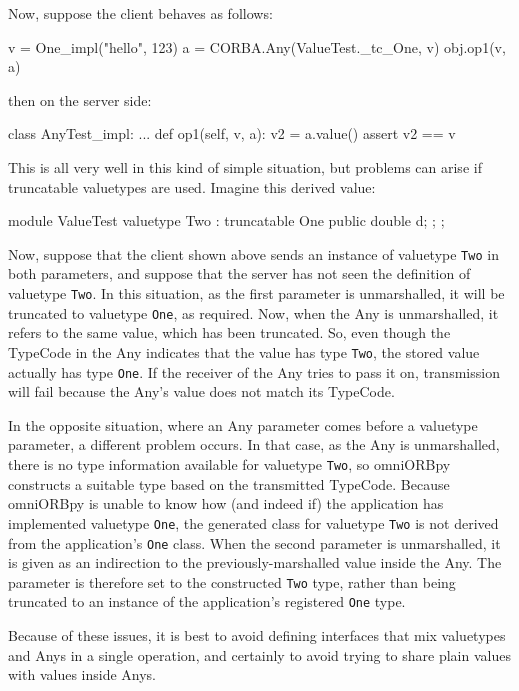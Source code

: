 \documentclass[11pt,twoside,a4paper]{book}
\newcommand{\type}[1]{\texttt{#1}}
\begin{document}
\noindent Now, suppose the client behaves as follows:

\begin{pylisting}
v = One_impl("hello", 123)
a = CORBA.Any(ValueTest._tc_One, v)
obj.op1(v, a)
\end{pylisting}

\noindent then on the server side:

\begin{pylisting}
class AnyTest_impl:
    ...
    def op1(self, v, a):
        v2 = a.value()
        assert v2 == v
\end{pylisting}

\noindent
This is all very well in this kind of simple situation, but problems
can arise if truncatable valuetypes are used. Imagine this derived
value:

\begin{idllisting}
module ValueTest {
  valuetype Two : truncatable One {
    public double d;
  };
};
\end{idllisting}

\noindent
Now, suppose that the client shown above sends an instance of
valuetype \type{Two} in both parameters, and suppose that the server
has not seen the definition of valuetype \type{Two}. In this
situation, as the first parameter is unmarshalled, it will be
truncated to valuetype \type{One}, as required. Now, when the Any is
unmarshalled, it refers to the same value, which has been truncated.
So, even though the TypeCode in the Any indicates that the value has
type \type{Two}, the stored value actually has type \type{One}. If the
receiver of the Any tries to pass it on, transmission will fail
because the Any's value does not match its TypeCode.

In the opposite situation, where an Any parameter comes before a
valuetype parameter, a different problem occurs. In that case, as the
Any is unmarshalled, there is no type information available for
valuetype \type{Two}, so omniORBpy constructs a suitable type based on
the transmitted TypeCode. Because omniORBpy is unable to know how (and
indeed if) the application has implemented valuetype \type{One}, the
generated class for valuetype \type{Two} is not derived from the
application's \type{One} class. When the second parameter is
unmarshalled, it is given as an indirection to the
previously-marshalled value inside the Any. The parameter is therefore
set to the constructed \type{Two} type, rather than being truncated to
an instance of the application's registered \type{One} type.

Because of these issues, it is best to avoid defining interfaces that
mix valuetypes and Anys in a single operation, and certainly to avoid
trying to share plain values with values inside Anys.




\backmatter


\end{document}
